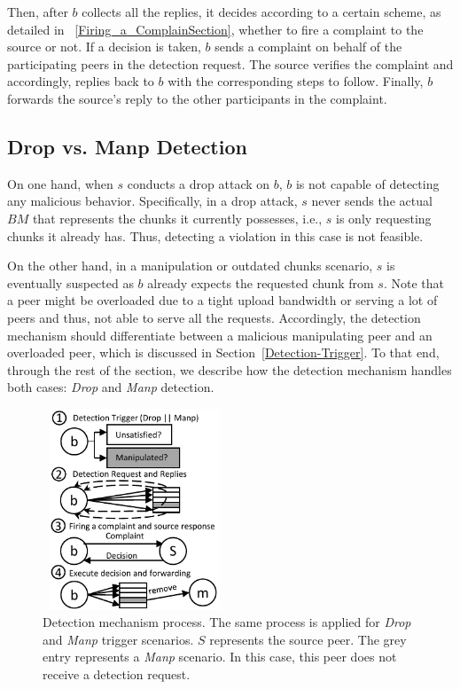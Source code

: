 Then, after $b$ collects all the replies, it decides according to a certain scheme, as detailed in ~\ref{Firing_a_ComplainSection}, whether to fire a complaint to the source or not.
If a decision is taken, $b$ sends a complaint on behalf of the participating peers in the detection request. 
The source verifies the complaint and accordingly, replies back to $b$ with the corresponding steps to follow. 
Finally, $b$ forwards the source's reply to the other participants in the complaint.

\subsection{Drop vs. Manp Detection}

On one hand, when $s$ conducts a drop attack on $b$, $b$ is not capable of detecting any malicious behavior.
Specifically, in a drop attack, $s$ never sends the actual $BM$ that represents the chunks it currently possesses, i.e., $s$ is only requesting chunks it already has.
Thus, detecting a violation in this case is not feasible.

On the other hand, in a manipulation or outdated chunks scenario, $s$ is eventually suspected as $b$ already expects the requested chunk from $s$.
Note that a peer might be overloaded due to a tight upload bandwidth or serving a lot of peers and thus, not able to serve all the requests.
Accordingly, the detection mechanism should differentiate between a malicious manipulating peer and an overloaded peer, which is discussed in Section~\ref{Detection-Trigger}.
To that end, through the rest of the section, we describe how the detection mechanism handles both cases: \textit{Drop} and \textit{Manp} detection.

\begin{figure}
 \centering
 \includegraphics[width=5.5cm,height=6cm]{./Figures/detection.pdf}
  \caption{Detection mechanism process. The same process is applied for \textit{Drop} and \textit{Manp} trigger scenarios. $S$ represents the source peer. The grey entry represents a \textit{Manp} scenario. In this case, this peer does not receive a detection request.}
\label{detection-blocks} 
\end{figure}

